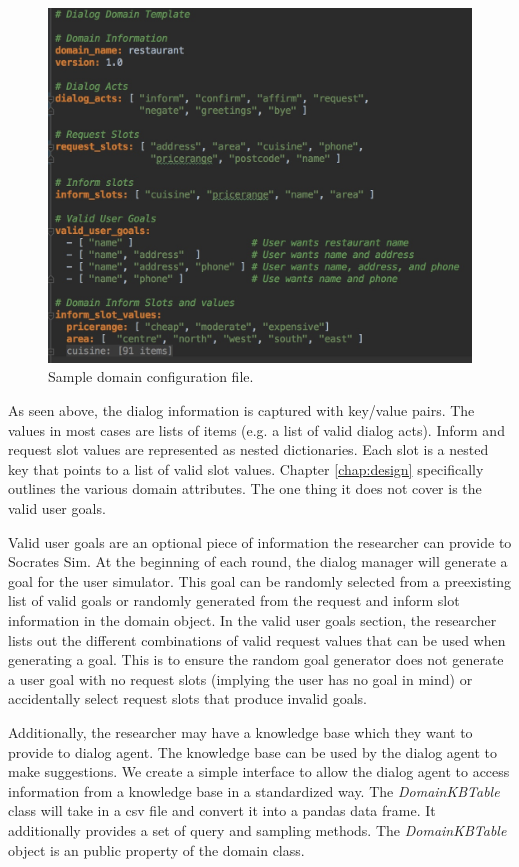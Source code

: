 \begin{figure}[h!]
	\centering
	\includegraphics[scale=.25]{diagrams/sample_domain.jpeg}
	\caption{ Sample domain configuration file. }
	\label{fig:sample_domain}
\end{figure}

As seen above, the dialog information is captured with key/value pairs. The values in most cases are lists of items (e.g. a list of valid dialog acts). Inform and request slot values are represented as nested dictionaries. Each slot is a nested key that points to a list of valid slot values. Chapter \ref{chap:design} specifically outlines the various domain attributes. The one thing it does not cover is the valid user goals. 

Valid user goals are an optional piece of information the researcher can provide to Socrates Sim. At the beginning of each round, the dialog manager will generate a goal for the user simulator. This goal can be randomly selected from a preexisting list of valid goals or randomly generated from the request and inform slot information in the domain object. In the valid user goals section, the researcher lists out the different combinations of valid request values that can be used when generating a goal. This is to ensure the random goal generator does not generate a user goal with no request slots (implying the user has no goal in mind) or accidentally select request slots that produce invalid goals.  

Additionally, the researcher may have a knowledge base which they want to provide to dialog agent. The knowledge base can be used by the dialog agent to make suggestions. We create a simple interface to allow the dialog agent to access information from a knowledge base in a standardized way. The \textit{DomainKBTable} class will take in a csv file and convert it into a pandas data frame. It additionally provides a set of query and sampling methods. The \textit{DomainKBTable} object is an public property of the domain class.

